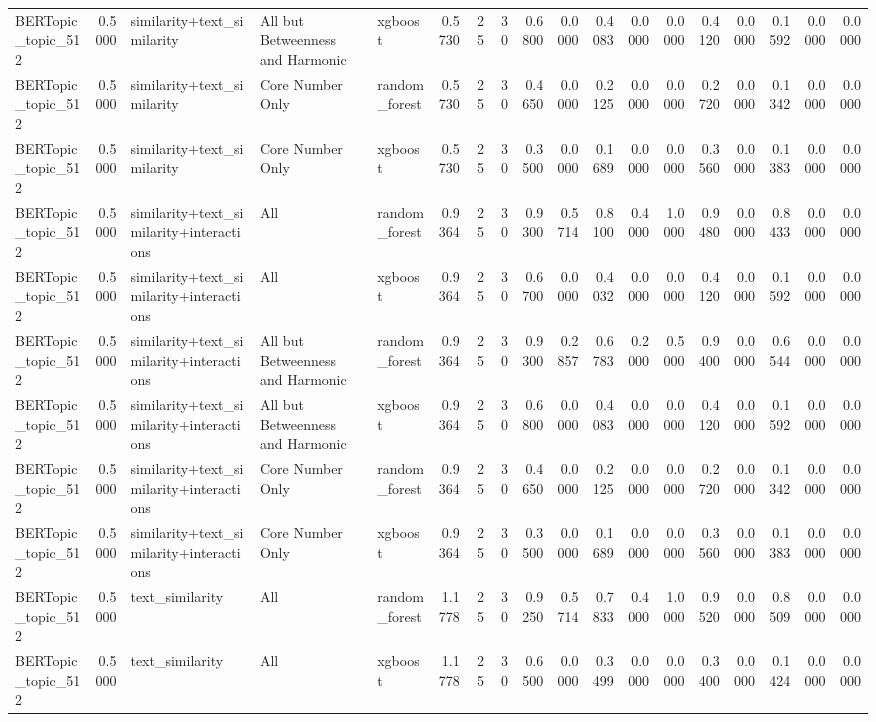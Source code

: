\begin{tabular}{lrlllrrrrrrrrrrrrr}
BERTopic_topic_512 & 0.5000 & similarity+text_similarity & All but Betweenness and Harmonic & xgboost & 0.5730 & 25 & 30 & 0.6800 & 0.0000 & 0.4083 & 0.0000 & 0.0000 & 0.4120 & 0.0000 & 0.1592 & 0.0000 & 0.0000 \\
BERTopic_topic_512 & 0.5000 & similarity+text_similarity & Core Number Only & random_forest & 0.5730 & 25 & 30 & 0.4650 & 0.0000 & 0.2125 & 0.0000 & 0.0000 & 0.2720 & 0.0000 & 0.1342 & 0.0000 & 0.0000 \\
BERTopic_topic_512 & 0.5000 & similarity+text_similarity & Core Number Only & xgboost & 0.5730 & 25 & 30 & 0.3500 & 0.0000 & 0.1689 & 0.0000 & 0.0000 & 0.3560 & 0.0000 & 0.1383 & 0.0000 & 0.0000 \\
BERTopic_topic_512 & 0.5000 & similarity+text_similarity+interactions & All & random_forest & 0.9364 & 25 & 30 & 0.9300 & 0.5714 & 0.8100 & 0.4000 & 1.0000 & 0.9480 & 0.0000 & 0.8433 & 0.0000 & 0.0000 \\
BERTopic_topic_512 & 0.5000 & similarity+text_similarity+interactions & All & xgboost & 0.9364 & 25 & 30 & 0.6700 & 0.0000 & 0.4032 & 0.0000 & 0.0000 & 0.4120 & 0.0000 & 0.1592 & 0.0000 & 0.0000 \\
BERTopic_topic_512 & 0.5000 & similarity+text_similarity+interactions & All but Betweenness and Harmonic & random_forest & 0.9364 & 25 & 30 & 0.9300 & 0.2857 & 0.6783 & 0.2000 & 0.5000 & 0.9400 & 0.0000 & 0.6544 & 0.0000 & 0.0000 \\
BERTopic_topic_512 & 0.5000 & similarity+text_similarity+interactions & All but Betweenness and Harmonic & xgboost & 0.9364 & 25 & 30 & 0.6800 & 0.0000 & 0.4083 & 0.0000 & 0.0000 & 0.4120 & 0.0000 & 0.1592 & 0.0000 & 0.0000 \\
BERTopic_topic_512 & 0.5000 & similarity+text_similarity+interactions & Core Number Only & random_forest & 0.9364 & 25 & 30 & 0.4650 & 0.0000 & 0.2125 & 0.0000 & 0.0000 & 0.2720 & 0.0000 & 0.1342 & 0.0000 & 0.0000 \\
BERTopic_topic_512 & 0.5000 & similarity+text_similarity+interactions & Core Number Only & xgboost & 0.9364 & 25 & 30 & 0.3500 & 0.0000 & 0.1689 & 0.0000 & 0.0000 & 0.3560 & 0.0000 & 0.1383 & 0.0000 & 0.0000 \\
BERTopic_topic_512 & 0.5000 & text_similarity & All & random_forest & 1.1778 & 25 & 30 & 0.9250 & 0.5714 & 0.7833 & 0.4000 & 1.0000 & 0.9520 & 0.0000 & 0.8509 & 0.0000 & 0.0000 \\
BERTopic_topic_512 & 0.5000 & text_similarity & All & xgboost & 1.1778 & 25 & 30 & 0.6500 & 0.0000 & 0.3499 & 0.0000 & 0.0000 & 0.3400 & 0.0000 & 0.1424 & 0.0000 & 0.0000 \\

\end{tabular}
